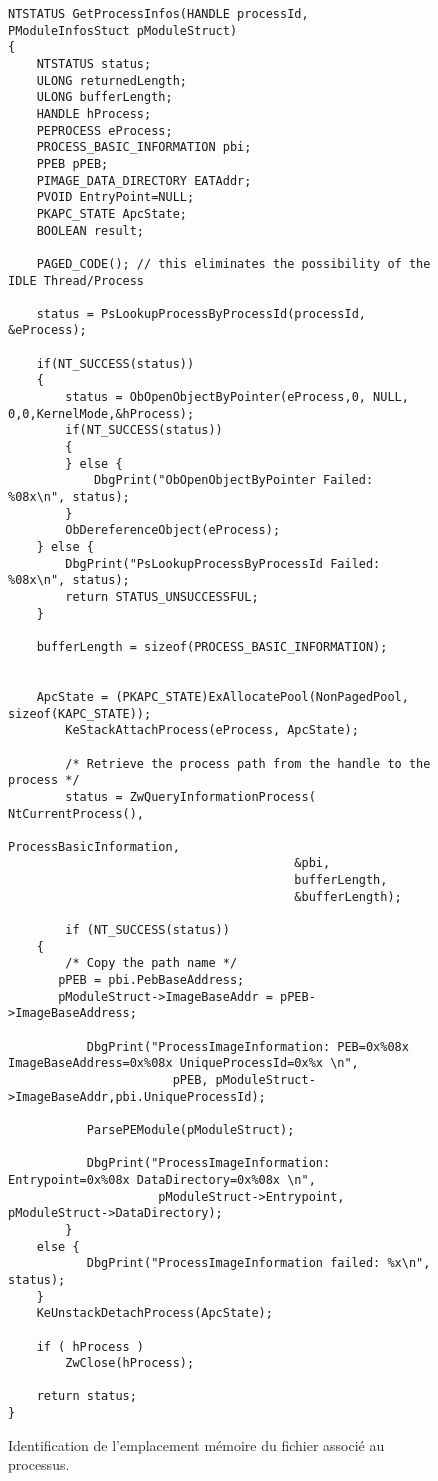 \documentclass[times,11pt,fullpage]{article}
\begin{document}
\begin{figure}
\scriptsize
\begin{verbatim}
NTSTATUS GetProcessInfos(HANDLE processId, PModuleInfosStuct pModuleStruct)
{
    NTSTATUS status;
    ULONG returnedLength;
    ULONG bufferLength;
    HANDLE hProcess;
    PEPROCESS eProcess;
    PROCESS_BASIC_INFORMATION pbi;
    PPEB pPEB;
    PIMAGE_DATA_DIRECTORY EATAddr;
    PVOID EntryPoint=NULL;
    PKAPC_STATE ApcState;  
    BOOLEAN result;
    
    PAGED_CODE(); // this eliminates the possibility of the IDLE Thread/Process
	
	status = PsLookupProcessByProcessId(processId, &eProcess);

	if(NT_SUCCESS(status))
	{
		status = ObOpenObjectByPointer(eProcess,0, NULL, 0,0,KernelMode,&hProcess);
		if(NT_SUCCESS(status))
		{
		} else {
			DbgPrint("ObOpenObjectByPointer Failed: %08x\n", status);
		}
		ObDereferenceObject(eProcess);
	} else {
		DbgPrint("PsLookupProcessByProcessId Failed: %08x\n", status);
		return STATUS_UNSUCCESSFUL;
	}
	
	bufferLength = sizeof(PROCESS_BASIC_INFORMATION);

  
	ApcState = (PKAPC_STATE)ExAllocatePool(NonPagedPool, sizeof(KAPC_STATE));   
        KeStackAttachProcess(eProcess, ApcState);   

        /* Retrieve the process path from the handle to the process */
        status = ZwQueryInformationProcess( NtCurrentProcess(),
                                        ProcessBasicInformation,
                                        &pbi,
                                        bufferLength,
                                        &bufferLength);

        if (NT_SUCCESS(status)) 
	{
        /* Copy the path name */
	   pPEB = pbi.PebBaseAddress;
	   pModuleStruct->ImageBaseAddr = pPEB->ImageBaseAddress;
       
           DbgPrint("ProcessImageInformation: PEB=0x%08x ImageBaseAddress=0x%08x UniqueProcessId=0x%x \n", 
                       pPEB, pModuleStruct->ImageBaseAddr,pbi.UniqueProcessId);
           
           ParsePEModule(pModuleStruct);
	   
           DbgPrint("ProcessImageInformation: Entrypoint=0x%08x DataDirectory=0x%08x \n", 
                     pModuleStruct->Entrypoint, pModuleStruct->DataDirectory); 
        }
	else {
           DbgPrint("ProcessImageInformation failed: %x\n", status);
	}
	KeUnstackDetachProcess(ApcState);

    if ( hProcess )
        ZwClose(hProcess);

    return status;
}
\end{verbatim}
\caption{Identification de l'emplacement mémoire du fichier associé au processus.\label{fig:GetProcessInfos}}
\end{figure}
\end{document}

